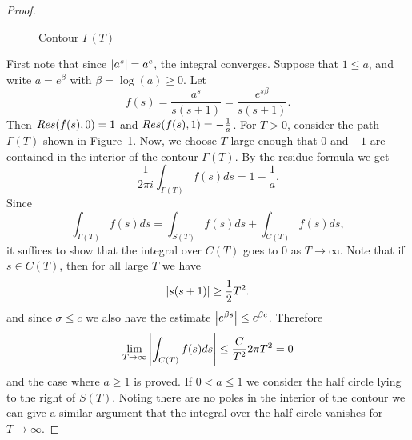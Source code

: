 \begin{proof}
\begin{figure}[!htb]
\begin{minipage}[c]{0.5\textwidth}
\end{minipage}
\caption{Contour $\Gamma(T)$}
\label{fig:ContourGamma}
\end{figure}
	First note that since $\left|a^s\right| = a^c$, the integral converges. Suppose that $1 \leq a$, and write $a = e^\beta$ with $\beta = \log(a) \geq 0$. Let
\begin{equation*}
	f(s) = \frac{a^s}{s(s + 1)} = \frac{e^{s \beta}}{s(s + 1)}.
\end{equation*}
	Then $\mathop{Res}(f(s), 0) = 1$ and $\mathop{Res}(f(s), 1) = -\frac{1}{a}$. For $T > 0$, consider the path $\Gamma(T)$ shown in Figure~\ref{fig:ContourGamma}. Now, we choose $T$ large enough that $0$ and $-1$ are contained in the interior of the contour $\Gamma(T)$. By the residue formula we get
\begin{equation*}
	\frac{1}{2 \pi i} \int _{\Gamma(T)} f(s) ds = 1 - \frac{1}{a}.
\end{equation*}
	Since
\begin{equation*}
	\int _{\Gamma(T)} f(s) ds = \int _{S(T)} f(s) ds + \int _{C(T)} f(s) ds,
\end{equation*}
	it suffices to show that the integral over $C(T)$ goes to $0$ as $T \to \infty$. Note that if $s \in C(T)$, then for all large $T$ we have
\begin{equation*}
	\left|s(s + 1)\right| \geq \frac{1}{2} T^2.
\end{equation*}
	and since $\sigma \leq c$ we also have the estimate $\left|e^{\beta s}\right| \leq e^{\beta c}$. Therefore
\begin{equation*}
	\lim _{T \to \infty} \left|\int _{C(T)} f(s) ds\right| \leq \frac{C}{T^2} 2 \pi T^2 = 0
\end{equation*}
	and the case where $a \geq 1$ is proved. If $0 < a \leq 1$ we consider the half circle lying to the right of $S(T)$. Noting there are no poles in the interior of the contour we can give a similar argument that the integral over the half circle vanishes for $T \to \infty$.
\end{proof}


